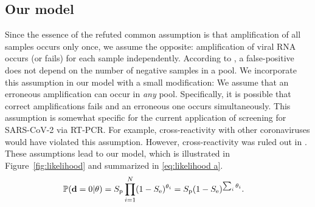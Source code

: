 \documentclass{article}
\begin{document}
\subsection*{Our model}\label{subsec:ours}
Since the essence of the refuted common assumption is that
amplification of all samples occurs only once, we assume the opposite:
amplification of viral RNA occurs (or fails) for each sample
independently. According to \cite{Simplistic1, Simplistic2, Kim,
  OptimalDorfmanPool}, a false-positive does not
depend on the number of negative samples in a pool. We incorporate
this assumption in our model with a small modification: We assume that
an erroneous amplification can occur in \emph{any} pool. Specifically,
it is possible that correct amplifications fails and an erroneous one
occurs simultaneously. This assumption is somewhat specific for the
current application of screening for SARS-CoV-2 via RT-PCR. For
example, cross-reactivity with other coronaviruses would have violated
this assumption. However, cross-reactivity was ruled out in
\cite{KitComparison}.
These assumptions lead to our model, which is illustrated in 
Figure~\ref{fig:likelihood} and summarized in
\eqref{eq:likelihood a}.%
\begin{align}%
    \Pr(\data=0 | \theta) &= \spec\prod_{i=1}^N
    (1-\sens)^{\theta_i} = \spec(1-\Se)^{\sum_i\theta_i}. \label{eq:likelihood a}
\end{align}
\end{document}
